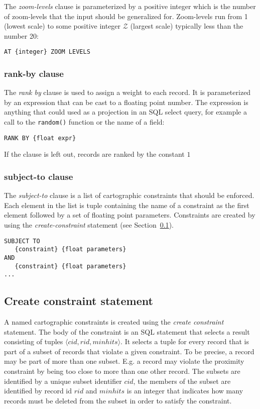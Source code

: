 The \emph{zoom-levels} clause is parameterized by a positive integer which is the number of zoom-levels that the input should be generalized for. Zoom-levels run from 1 (lowest scale) to some positive integer $\mathcal{Z}$ (largest scale) typically less than the number 20:

\begin{lstlisting}
AT {integer} ZOOM LEVELS
\end{lstlisting}

\subsubsection{rank-by clause}

The \emph{rank by} clause is used to assign a weight to each record. It is parameterized by an expression that can be cast to a floating point number. The expression is anything that could used as a projection in an SQL select query, for example a call to the \texttt{random()} function or the name of a field:

\begin{lstlisting}
RANK BY {float expr}
\end{lstlisting}

If the clause is left out, records are ranked by the constant $1$

\subsubsection{subject-to clause}

The \emph{subject-to} clause is a list of cartographic constraints that should be enforced. Each element in the list is tuple containing the name of a constraint as the first element followed by a set of floating point parameters. Constraints are created by using the \emph{create-constraint} statement (see Section~\ref{sec:create-constraint-statement}).

\begin{lstlisting}
SUBJECT TO 
   {constraint} {float parameters} 
AND
   {constraint} {float parameters}
...
\end{lstlisting}

\subsection{Create constraint statement}
\label{sec:create-constraint-statement}

A named cartographic constraints is created using the \emph{create constraint} statement. The body of the constraint is an SQL statement that selects a result consisting of tuples $\langle cid, rid, minhits \rangle$. It selects a tuple for every record that is part of a subset of records that violate a given constraint. To be precise, a record may be part of more than one subset. E.g. a record may violate the proximity constraint by being too close to more than one other record. The subsets are identified by a unique subset identifier $cid$,  the members of the subset are identified by record id $rid$ and $minhits$ is an integer that indicates how many records must be deleted from the subset in order to satisfy the constraint.

